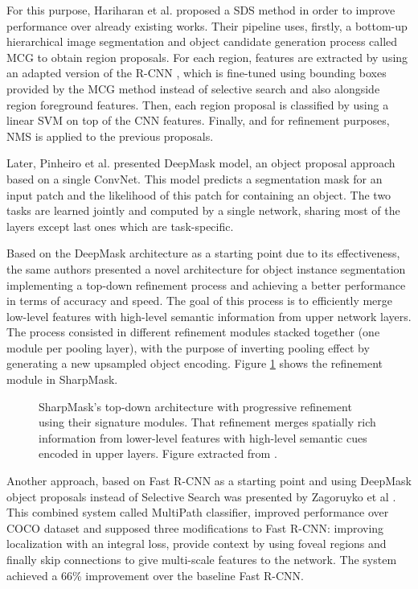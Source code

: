 For this purpose, Hariharan et al. \cite{Hariharan2014} proposed a \ac{SDS} method in order to improve performance over already existing works. Their pipeline uses, firstly, a bottom-up hierarchical image segmentation and object candidate generation process called \ac{MCG} \cite{Arbelaez2014} to obtain region proposals. For each region, features are extracted by using an adapted version of the \ac{R-CNN} \cite{Girshick2014}, which is fine-tuned using bounding boxes provided by the \ac{MCG} method instead of selective search and also alongside region foreground features. Then, each region proposal is classified by using a linear \ac{SVM} on top of the \acs{CNN} features. Finally, and for refinement purposes, \ac{NMS} is applied to the previous proposals.

Later, Pinheiro et al. \cite{Pinheiro2015} presented DeepMask model, an object proposal approach based on a single ConvNet. This model predicts a segmentation mask for an input patch and the likelihood of this patch for containing an object. The two tasks are learned jointly and computed by a single network, sharing most of the layers except last ones which are task-specific. 

Based on the DeepMask architecture as a starting point due to its effectiveness, the same authors presented a novel architecture for object instance segmentation implementing a top-down refinement process \cite{Pinheiro2016} and achieving a better performance in terms of accuracy and speed. The goal of this process is to efficiently merge low-level features with high-level semantic information from upper network layers. The process consisted in different refinement modules stacked together (one module per pooling layer), with the purpose of inverting pooling effect by generating a new upsampled object encoding. Figure \ref{fig:sharpmask-refinement-module} shows the refinement module in SharpMask.

\begin{figure}[!hbt]
	\centering
	\caption{SharpMask's top-down architecture with progressive refinement using their signature modules. That refinement merges spatially rich information from lower-level features with high-level semantic cues encoded in upper layers. Figure extracted from \cite{Pinheiro2015}.}
	\label{fig:sharpmask-refinement-module}
\end{figure}

Another approach, based on Fast R-CNN as a starting point and using DeepMask object proposals instead of Selective Search was presented by Zagoruyko et al \cite{Zagoruyko2016}. This combined system called MultiPath classifier, improved performance over COCO dataset and supposed three modifications to Fast R-CNN: improving localization with an integral loss, provide context by using foveal regions and finally skip connections to give multi-scale features to the network. The system achieved a 66\% improvement over the baseline Fast R-CNN.

